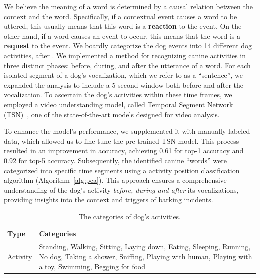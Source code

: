We believe the meaning of a word is determined by a causal relation between the context
and the word. Specifically, if a contextual event causes a word to be uttered, this usually
means that this word is a \textbf{reaction} to the event. On the other hand, if a word causes an
event to occur, this means that the word is a \textbf{request} to the event.
We boardly categorize the dog events into 14 different dog activities, 
after \citet{wang2023towards}. 
We implemented a method for recognizing canine activities in three distinct phases: 
before, during, and after the utterance of a word. 
For each isolated segment of a dog's vocalization, which we refer to as a ``sentence'', 
we expanded the analysis to include a 5-second window both before and after the vocalization. To ascertain the dog's activities within these time frames, we employed a video understanding model, called Temporal Segment Network (TSN)~\citep{wang2016temporal}, 
one of the state-of-the-art models designed for video analysis. 

To enhance the model's performance, we supplemented it with manually labeled data, which allowed us to fine-tune the pre-trained TSN model. This process resulted in an improvement in accuracy, achieving 0.61 for top-1 accuracy and 0.92 for top-5 accuracy. Subsequently, the identified canine ``words'' were categorized into specific time segments using a activity position classification algorithm (Algorithm~\ref{alg:pca}). This approach ensures a comprehensive understanding of the dog's activity \textit{before, during and after}  its vocalizations, providing insights into the context and triggers of barking incidents.
\begin{table}[th]
	\small
	\begin{tabular}{p{}|p{}}
		\toprule
		\textbf{Type} & \textbf{Categories} \\ \midrule
		Activity & Standing, Walking, Sitting, Laying down, Eating, Sleeping, Running, No dog, Taking a shower, Sniffing, Playing with human, Playing with a toy, Swimming, Begging for food\\ 
		\bottomrule
	\end{tabular}
	\caption{The categories of dog's activities.} 
	\label{tab:acts}
\end{table}

